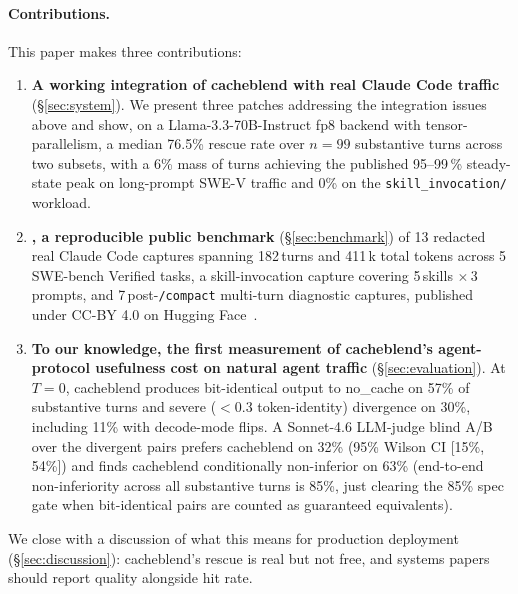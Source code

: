 \paragraph{Contributions.} This paper makes three contributions:

\begin{enumerate}
\item \textbf{A working integration of cacheblend with real Claude Code
traffic} (\S\ref{sec:system}). We present three patches addressing the
integration issues above and show, on a Llama-3.3-70B-Instruct fp8
backend with tensor-parallelism, a median 76.5\% rescue rate over
$n{=}99$ substantive turns across two \dataset{} subsets, with a 6\%
mass of turns achieving the published 95--99\,\% steady-state peak
on long-prompt SWE-V traffic and 0\% on the
\texttt{skill\_invocation/} workload.

\item \textbf{\dataset, a reproducible public benchmark}
(\S\ref{sec:benchmark}) of 13 redacted real Claude Code captures
spanning 182\,turns and 411\,k total tokens across 5\,SWE-bench
Verified tasks, a skill-invocation capture covering 5\,skills
$\times$\,3\,prompts, and 7\,post-\texttt{/compact} multi-turn
diagnostic captures, published under CC-BY 4.0 on Hugging
Face~\cite{claudecode-trace-hf}.

\item \textbf{To our knowledge, the first measurement of cacheblend's agent-protocol
usefulness cost on natural agent traffic} (\S\ref{sec:evaluation}).
At $T=0$, cacheblend produces bit-identical output to no\_cache on 57\%
of substantive turns and severe ($<$0.3 token-identity) divergence on
30\%, including 11\% with decode-mode flips. A Sonnet-4.6 LLM-judge
blind A/B over the divergent pairs prefers cacheblend on 32\% (95\%
Wilson CI [15\%, 54\%]) and finds cacheblend conditionally non-inferior
on 63\% (end-to-end non-inferiority across all substantive turns is
85\%, just clearing the 85\% spec gate when bit-identical pairs are
counted as guaranteed equivalents).
\end{enumerate}

We close with a discussion of what this means for production deployment
(\S\ref{sec:discussion}): cacheblend's rescue is real but not free, and
systems papers should report quality alongside hit rate.

